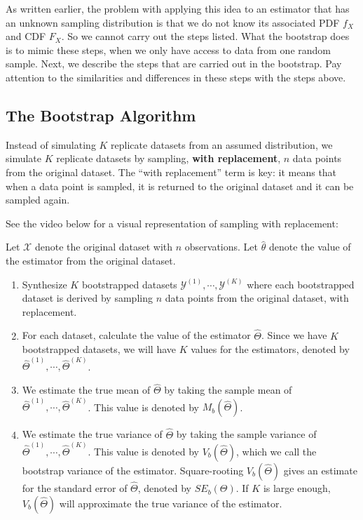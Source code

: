 \documentclass[
]{book}
\begin{document}
As written earlier, the problem with applying this idea to an estimator that has an unknown sampling distribution is that we do not know its associated PDF \(f_X\) and CDF \(F_X\). So we cannot carry out the steps listed. What the bootstrap does is to mimic these steps, when we only have access to data from one random sample. Next, we describe the steps that are carried out in the bootstrap. Pay attention to the similarities and differences in these steps with the steps above.

\hypertarget{the-bootstrap-algorithm}{%
\subsection{The Bootstrap Algorithm}\label{the-bootstrap-algorithm}}

Instead of simulating \(K\) replicate datasets from an assumed distribution, we simulate \(K\) replicate datasets by sampling, \textbf{with replacement}, \(n\) data points from the original dataset. The ``with replacement'' term is key: it means that when a data point is sampled, it is returned to the original dataset and it can be sampled again.

See the video below for a visual representation of sampling with replacement:

Let \(\mathcal{X}\) denote the original dataset with \(n\) observations. Let \(\hat{\theta}\) denote the value of the estimator from the original dataset.

\begin{enumerate}
\def\labelenumi{\arabic{enumi}.}
\item
  Synthesize \(K\) bootstrapped datasets \(\mathcal{Y}^{(1)}, \cdots, \mathcal{Y}^{(K)}\) where each bootstrapped dataset is derived by sampling \(n\) data points from the original dataset, with replacement.
\item
  For each dataset, calculate the value of the estimator \(\hat{\Theta}\). Since we have \(K\) bootstrapped datasets, we will have \(K\) values for the estimators, denoted by \(\hat{\Theta}^{(1)}, \cdots, \hat{\Theta}^{(K)}\).
\item
  We estimate the true mean of \(\hat{\Theta}\) by taking the sample mean of \(\hat{\Theta}^{(1)}, \cdots, \hat{\Theta}^{(K)}\). This value is denoted by \(M_b(\hat{\Theta})\).
\item
  We estimate the true variance of \(\hat{\Theta}\) by taking the sample variance of \(\hat{\Theta}^{(1)}, \cdots, \hat{\Theta}^{(K)}\). This value is denoted by \(V_b(\hat{\Theta})\), which we call the bootstrap variance of the estimator. Square-rooting \(V_b(\hat{\Theta})\) gives an estimate for the standard error of \(\hat{\Theta}\), denoted by \(SE_b(\Theta)\). If \(K\) is large enough, \(V_b(\hat{\Theta})\) will approximate the true variance of the estimator.
\end{enumerate}
\end{document}
